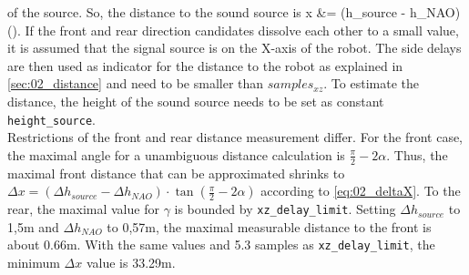 of the source.
So, the distance to the sound source is
\bal
\Delta x &= (\Delta h_{source} - \Delta h_{NAO}) \cdot \tan(\gamma).
\label{eq:02_deltaX}
\eal
If the front and rear direction candidates dissolve each other to a small
value, it is assumed that the signal source is on the X-axis of the robot.
The side delays are then used as indicator for the distance to the robot as
explained in \cref{sec:02_distance} and need to be smaller than
 $samples_{xz}$.
To estimate the distance, the height of the sound source needs to be set as
constant  \lstinline!height_source!.\\
Restrictions of the front and rear distance measurement differ.
For the front case, the maximal angle for a unambiguous distance calculation
is $\frac{\pi}{2}- 2\alpha$.
Thus, the maximal front distance that can be approximated shrinks to
$\Delta x = (\Delta h_{source} - \Delta h_{NAO}) \cdot \tan(\frac{\pi}{2} - 2\alpha)$
according to \cref{eq:02_deltaX}.
To the rear, the maximal value for $\gamma$ is bounded by 
\lstinline!xz_delay_limit!.
Setting $\Delta h_{source}$ to 1,5\si{m} and $\Delta h_{NAO}$ to 0,57\si{m},
the maximal measurable distance to the front is about 0.66\si{m}.
With the same values and 5.3 samples as \lstinline!xz_delay_limit!, the
minimum $\Delta x$ value is 33.29\si{m}.
